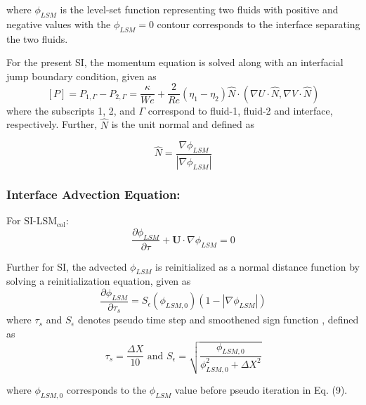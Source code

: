 \documentclass[aps,prfluids,reprint,nofootinbib,onecolumn,groupedaddress,showkeys]{revtex4-2}
\begin{document}
	
	where $\phi_{LSM}$ is the level-set function representing two fluids with positive and negative values with the $\phi_{LSM}=0$ contour corresponds to the interface separating the two fluids. 
	
	For the present SI, the momentum equation is solved along with an interfacial jump boundary condition, given as 
	\begin{equation}\label{eqt:Pressure_JumpBC}
		[P]= P_{1,\Gamma}-P_{2,\Gamma}=\frac{\kappa}{We}+\frac{2}{Re}(\eta_{1}-\eta_{2})\hat{N}\cdot(\nabla U\cdot\hat{N},\nabla V\cdot\hat{N})
	\end{equation}
	where the subscripts 1, 2, and $\Gamma$ correspond to fluid-1, fluid-2 and interface, respectively. Further, $\hat{N}$ is the unit normal and defined as 
	
	\begin{equation}\label{eqt:heaviside_SI2}
		\hat{N}=\frac{\nabla\phi_{LSM}}{|\nabla\phi_{LSM}|}
	\end{equation}
	
	\subsubsection*{Interface Advection Equation:}
	\noindent For SI-LSM$_{\text{col}}$:
	\begin{equation}\label{eqt:LSadvection}
		\frac{\partial\phi_{LSM}}{\partial\tau}+\mathbf{U}\cdot\nabla\phi_{LSM}=0
	\end{equation}
	
	Further for SI, the advected $\phi_{LSM}$ is reinitialized as a normal distance function by solving a reinitialization equation, given as
	\begin{equation}\label{eqt:reinitialization}
		\frac{\partial\phi_{LSM}}{\partial\tau_s}=S_{\epsilon}(\phi_{LSM,0})(1-|\nabla\phi_{LSM}|)
	\end{equation}
	where $\tau_s$ and $S_{\epsilon}$ denotes pseudo time step and smoothened sign function \cite{Sussman1994}, defined as
	\begin{equation*}
		\tau_s=\frac{\Delta X}{10} \text{ and } S_{\epsilon}=\sqrt{\frac{\phi_{LSM,0}}{\phi_{LSM,0}^2+\Delta X^2}}
	\end{equation*} 
	
	\noindent where $\phi_{LSM,0}$ corresponds to the $\phi_{LSM}$ value before pseudo iteration in Eq. (9). 
	
\end{document}
